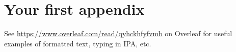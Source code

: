 \documentclass[twoside]{memoir}
\begin{document}
\appendix
\chapter{Your first appendix}


See \url{https://www.overleaf.com/read/qyhckhfyfvmb} on Overleaf for useful examples of formatted text, typing in IPA, etc.

\backmatter


\end{document}
